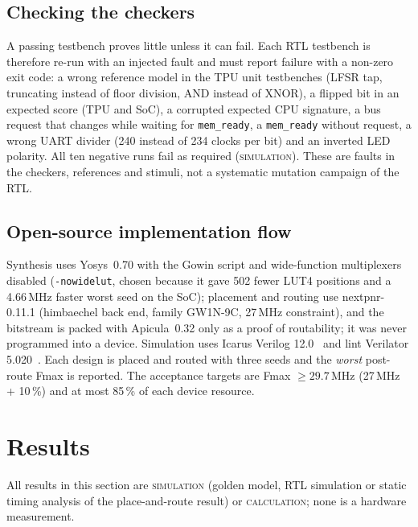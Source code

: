 \documentclass[conference]{IEEEtran}
\newcommand{\lbl}[1]{\textsc{#1}}    %
\begin{document}
\subsection{Checking the checkers}
A passing testbench proves little unless it can fail. Each RTL testbench is
therefore re-run with an injected fault and must report failure with a
non-zero exit code: a wrong reference model in the TPU unit testbenches
(LFSR tap, truncating instead of floor division, AND instead of XNOR), a
flipped bit in an expected score (TPU and SoC), a corrupted expected CPU
signature, a bus request that changes while waiting for
\texttt{mem\_ready}, a \texttt{mem\_ready} without request, a wrong UART
divider (240 instead of 234 clocks per bit) and an inverted LED polarity. All
ten negative runs fail as required (\lbl{simulation}). These are faults in
the checkers, references and stimuli, not a systematic mutation campaign of
the RTL.

\subsection{Open-source implementation flow}
Synthesis uses Yosys~0.70 with the Gowin script and wide-function
multiplexers disabled (\texttt{-nowidelut}, chosen because it gave 502 fewer
LUT4 positions and a 4.66\,MHz faster worst seed on the SoC); placement and
routing use nextpnr-0.11.1 (himbaechel back end, family GW1N-9C, 27\,MHz
constraint), and the bitstream is packed with Apicula~0.32 only as a proof of
routability; it was never programmed into a device. Simulation uses Icarus
Verilog 12.0~\cite{icarus} and lint Verilator 5.020~\cite{verilator}.
Each design is placed and routed with three seeds and the \emph{worst}
post-route Fmax is reported. The acceptance targets are Fmax $\ge 29.7$\,MHz
(27\,MHz + 10\,\%) and at most 85\,\% of each device resource.

\section{Results}
\label{sec:results}
All results in this section are \lbl{simulation} (golden model, RTL
simulation or static timing analysis of the place-and-route result) or
\lbl{calculation}; none is a hardware measurement.
\end{document}
